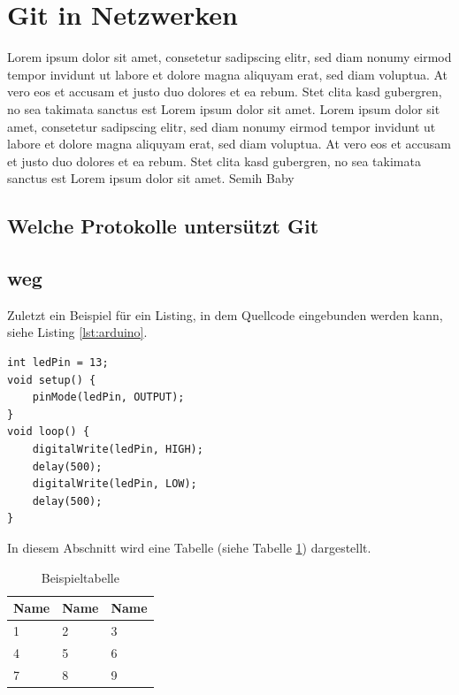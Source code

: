 \documentclass[12pt,a4paper,bibliography=totocnumbered,listof=totocnumbered]{scrartcl}
\begin{document}
\section{Git in Netzwerken}
Lorem ipsum dolor sit amet, consetetur sadipscing elitr, sed diam nonumy eirmod tempor invidunt ut labore et dolore magna aliquyam erat, sed diam voluptua. At vero eos et accusam et justo duo dolores et ea rebum. Stet clita kasd gubergren, no sea takimata sanctus est Lorem ipsum dolor sit amet. Lorem ipsum dolor sit amet, consetetur sadipscing elitr, sed diam nonumy eirmod tempor invidunt ut labore et dolore magna aliquyam erat, sed diam voluptua. At vero eos et accusam et justo duo dolores et ea rebum. Stet clita kasd gubergren, no sea takimata sanctus est Lorem ipsum dolor sit amet. Semih Baby

\subsection{Welche Protokolle untersützt Git}
\pagebreak

\subsection{weg}
Zuletzt ein Beispiel für ein Listing, in dem Quellcode eingebunden werden kann, siehe Listing \ref{lst:arduino}.

\vspace{1em}
\begin{lstlisting}[caption=Arduino Beispielprogramm, label=lst:arduino]
int ledPin = 13;
void setup() {
    pinMode(ledPin, OUTPUT);
}
void loop() {
    digitalWrite(ledPin, HIGH);
    delay(500);
    digitalWrite(ledPin, LOW);
    delay(500);
}
\end{lstlisting}

In diesem Abschnitt wird eine Tabelle (siehe Tabelle \ref{tab:beispiel}) dargestellt.

\vspace{1em}
\begin{table}[!h]
	\centering
	\begin{tabular}{|l|l|l|}
		\hline
		\textbf{Name} & \textbf{Name} & \textbf{Name}\\
		\hline
		1 & 2 & 3\\
		\hline
		4 & 5 & 6\\
		\hline
		7 & 8 & 9\\
		\hline
	\end{tabular}
	\caption{Beispieltabelle}
	\label{tab:beispiel}
\end{table}
\end{document}
